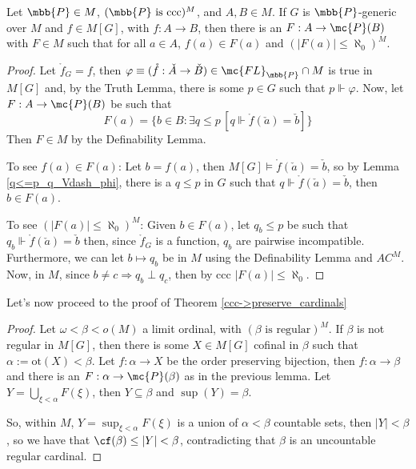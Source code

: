 \begin{lemma}{}{}
    Let $\mbb{P}\in M$, $(\mbb{P}\text{ is ccc})^M$, and $A,B\in M$. If $G$ is $\mbb{P}$-generic over $M$ and $f\in M[G]$, with $f:A\to B$, then there is an $F:A\to\mc{P}(B)$ with $F\in M$ such that for all $a\in A$, $f(a)\in F(a)$ and $(\lvert F(a)\rvert\leq\aleph_0)^M$.
\end{lemma}

\begin{proof}
    Let $\mathring{f}_G=f$, then $\varphi\equiv(\mathring{f}:\check{A}\to\check{B})\in\mc{FL}_{\mbb{P}}\cap M$ is true in $M[G]$ and, by the Truth Lemma, there is some $p\in G$ such that $p\Vdash\varphi$. Now, let $F:A\to\mc{P}(B)$ be such that
    $$F(a)=\{b\in B:\exists q\leq p\,[q\Vdash\mathring{f}(\check{a})=\check{b}]\}$$
    Then $F\in M$ by the Definability Lemma.
    
    To see $f(a)\in F(a)$: Let $b=f(a)$, then $M[G]\vDash\mathring{f}(\check{a})=\check{b}$, so by Lemma \ref{q<=p_q_Vdash_phi}, there is a $q\leq p$ in $G$ such that $q\Vdash\mathring{f}(\check{a})=\check{b}$, then $b\in F(a)$.

    To see $(\lvert F(a)\rvert\leq\aleph_0)^M$: Given $b\in F(a)$, let $q_b\leq p$ be such that $q_b\Vdash\mathring{f}(\check{a})=\check{b}$ then, since $\mathring{f}_G$ is a function, $q_b$ are pairwise incompatible. Furthermore, we can let $b\mapsto q_b$ be in $M$ using the Definability Lemma and $AC^M$. Now, in $M$, since $b\neq c\Rightarrow q_b\perp q_c$, then by ccc $\lvert F(a)\rvert\leq\aleph_0$.
\end{proof}

Let's now proceed to the proof of Theorem \ref{ccc->preserve_cardinals}

\begin{proof}
    Let $\omega<\beta<o(M)$ a limit ordinal, with $(\beta\text{ is regular})^M$. If $\beta$ is not regular in $M[G]$, then there is some $X\in M[G]$ cofinal in $\beta$ such that $\alpha:=\text{ot}(X)<\beta$. Let $f:\alpha\to X$ be the order preserving bijection, then $f:\alpha\to\beta$ and there is an $F:\alpha\to\mc{P}(\beta)$ as in the previous lemma. Let $Y=\bigcup_{\xi<\alpha}F(\xi)$, then $Y\subseteq\beta$ and $\sup(Y)=\beta$.

    So, within $M$, $Y=\sup_{\xi<\alpha}F(\xi)$ is a union of $\alpha<\beta$ countable sets, then $\lvert Y\rvert<\beta$, so we have that $\cf(\beta)\leq\lvert Y\rvert<\beta$, contradicting that $\beta$ is an uncountable regular cardinal.
\end{proof}

